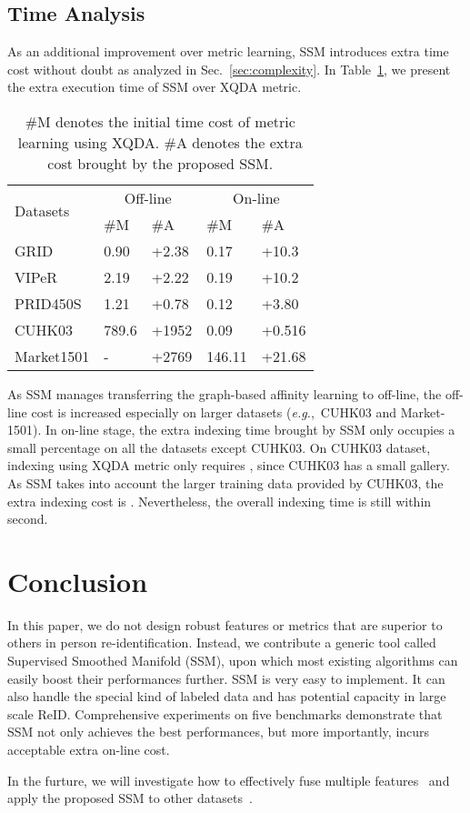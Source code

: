 \documentclass[10pt,twocolumn,letterpaper]{article}
\def\eg{\emph{e.g.}}
\begin{document}
\subsection{Time Analysis}
As an additional improvement over metric learning, SSM introduces extra time cost without doubt as analyzed in Sec.~\ref{sec:complexity}. In Table~\ref{table:time}, we present the extra execution time of SSM over XQDA metric.
\begin{table}[tb]
\small
\centering
\begin{tabular}{|l|*{2}{p{1.15cm}<{\centering}}|*{2}{p{1.15cm}<{\centering}}|}
\hline
\multirow{2}{*}{Datasets}        & \multicolumn{2}{c|}{Off-line} & \multicolumn{2}{c|}{On-line}\\
\cline{2-5}
            & \#M & \#A  & \#M  & \#A  \\
\hline
\hline
GRID  & 0.90 & +2.38 & 0.17  &  +10.3  \\
VIPeR  & 2.19 & +2.22  & 0.19 &  +10.2  \\
PRID450S  & 1.21 & +0.78 & 0.12 & +3.80  \\
CUHK03  & 789.6 & +1952 & 0.09 &  +0.516 \\
Market1501  & - & +2769 & 146.11 & +21.68  \\
\hline
\end{tabular}
\caption{\#M denotes the initial time cost of metric learning using XQDA. \#A denotes the extra cost brought by the proposed SSM.}
\label{table:time}
\vspace{-2ex}
\end{table}
As SSM manages transferring the graph-based affinity learning to off-line, the off-line cost is increased especially on larger datasets (\eg,~CUHK03 and Market-1501).
In on-line stage, the extra indexing time brought by SSM only occupies a small percentage on all the datasets except CUHK03. On CUHK03 dataset, indexing using XQDA metric only requires , since CUHK03 has a small gallery. As SSM takes into account the larger training data provided by CUHK03, the extra indexing cost is . Nevertheless, the overall indexing time is still within  second.

\section{Conclusion} \label{sec:con}
In this paper, we do not design robust features or metrics that are superior to others in person re-identification. Instead, we contribute a generic tool called Supervised Smoothed Manifold (SSM), upon which most existing algorithms can easily boost their performances further. SSM is very easy to implement. It can also handle the special kind of labeled data and has potential capacity in large scale ReID.
Comprehensive experiments on five benchmarks demonstrate that SSM not only achieves the best performances, but more importantly, incurs acceptable extra on-line cost.

In the furture, we will investigate how to effectively fuse multiple features~\cite{MetricEmsemble} and apply the proposed SSM to other datasets~\cite{OIM}.



{\small


}
\end{document}
